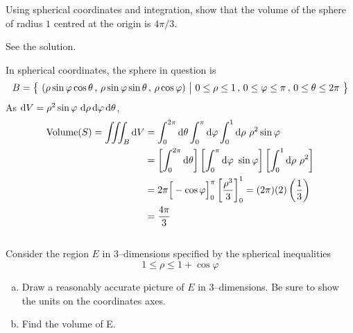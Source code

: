\begin{question}[M200 2008A] %
Using spherical coordinates and integration, show that the volume of
the sphere of radius $1$ centred at the origin is $4\pi/3$.
\end{question}

%

\begin{answer}
See the solution.
\end{answer}

\begin{solution}
In spherical coordinates, the sphere in question is
\begin{align*}
B =\big\{ \ (\rho\sin\varphi\cos\theta\,,\,\rho\sin\varphi\sin\theta\,,\,
          \rho\cos\varphi)\ \big|\ 0\le\rho\le 1\,,\,0\le\varphi\le\pi\,,\,
          0\le\theta\le 2\pi\ \big\}
\end{align*}
As $\mathrm{d}V =\rho^2\sin\varphi\ \mathrm{d}\rho\,\mathrm{d}\varphi\,\mathrm{d}\theta$,
\begin{align*}
\text{Volume}(S)
=\tripInt_B\dee{V}
&=\int_0^{2\pi}\dee{\theta}\int_0^{\pi}\dee{\varphi}\int_0^1\dee{\rho}\ 
         \rho^2\sin\varphi \\
&=\left[\int_0^{2\pi}\dee{\theta}\right]
  \left[\int_0^{\pi}\dee{\varphi}\ \sin\varphi\right]
  \left[\int_0^1\dee{\rho}\ \rho^2\right] \\
&= 2\pi\Big[-\cos\varphi\Big]_0^\pi \left[\frac{\rho^3}{3}\right]_0^1 
 =(2\pi)(2)\left(\frac{1}{3}\right) \\
&=\frac{4\pi}{3}
\end{align*}
\end{solution}


\subsection*{\Procedural}

\begin{question}[M200 2006A] %
Consider the region $E$ in $3$--dimensions specified by the 
spherical inequalities 
\begin{equation*}
1 \le \rho \le 1 + \cos \varphi
\end{equation*}
\begin{enumerate}[(a)]
\item
  Draw a reasonably accurate picture of $E$ in 3--dimensions. 
Be sure to show the units on the coordinates axes. 

\item
  Find the volume of E. 
\end{enumerate}
\end{question}

